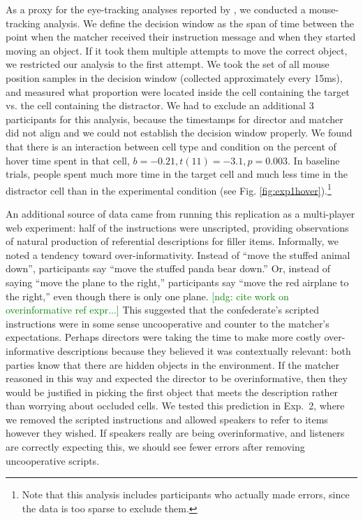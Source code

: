 \documentclass[10pt,letterpaper]{article}
\newcommand{\ndg}[1]{\textcolor{Green}{[ndg: #1]}}
\begin{document}
As a proxy for the eye-tracking analyses reported by , we conducted a mouse-tracking analysis. We define the decision window as the span of time between the point when the matcher received their instruction message and when they started moving an object. If it took them multiple attempts to move the correct object, we restricted our analysis to the first attempt. We took the set of all mouse position samples in the decision window (collected approximately every 15ms), and measured what proportion were located inside the cell containing the target vs. the cell containing the distractor.  We had to exclude an additional 3 participants for this analysis, because the timestamps for director and matcher did not align and we could not establish the decision window properly.
We found that there is an interaction between cell type and condition on the percent of hover time spent in that cell, $b = -0.21, t(11) = -3.1, p = 0.003$. In baseline trials, people spent much more time in the target cell and much less time in the distractor cell than in the experimental condition (see Fig. \ref{fig:exp1hover}).\footnote{Note that this analysis includes participants who actually made errors, since the data is too sparse to exclude them.} %

An additional source of data came from running this replication as a multi-player web experiment: half of the instructions were unscripted, providing observations of natural production of referential descriptions for filler items. 
Informally, we noted a tendency toward over-informativity. Instead of ``move the stuffed animal down'', participants say ``move the stuffed panda bear down.'' Or, instead of saying ``move the plane to the right,'' participants say ``move the red airplane to the right,'' even though there is only one plane. 
\ndg{cite work on overinformative ref expr...}
This suggested that the confederate's scripted instructions were in some sense uncooperative and counter to the matcher's expectations. Perhaps directors were taking the time to make more costly over-informative descriptions because they believed it was contextually relevant: both parties know that there are hidden objects in the environment. If the matcher reasoned in this way and expected the director to be overinformative, then they would be justified in picking the first object that meets the description rather than worrying about occluded cells. We tested this prediction in Exp.~2, where we removed the scripted instructions and allowed speakers to refer to items however they wished. If speakers really are being overinformative, and listeners are correctly expecting this, we should see fewer errors after removing uncooperative scripts.
\end{document}
